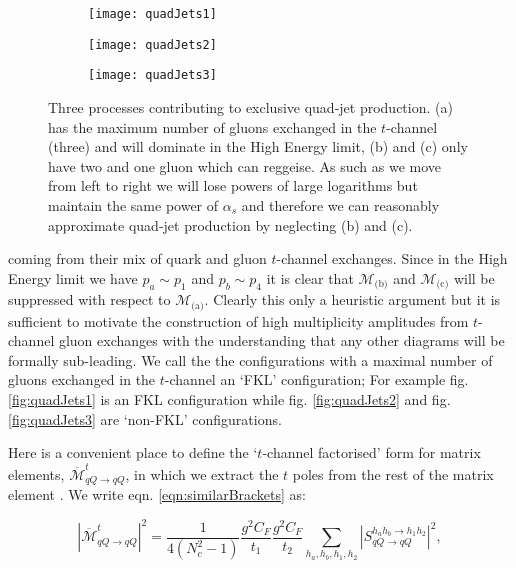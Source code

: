		\begin{figure}[hbt]
			\centering
			\begin{subfigure}[b]{0.31\textwidth}
				\texttt{[image: quadJets1]}
				\caption{}
				\label{fig:quadJets1}
			\end{subfigure}
			\begin{subfigure}[b]{0.31\textwidth}
				\texttt{[image: quadJets2]}
				\caption{}
				\label{fig:quadJets2}
			\end{subfigure}
			\begin{subfigure}[b]{0.31\textwidth}
				\texttt{[image: quadJets3]}
				\caption{}
				\label{fig:quadJets3}
			\end{subfigure}
			\caption{Three processes contributing to exclusive quad-jet production. (a) has the
			maximum number of gluons exchanged in the $t$-channel (three) and will dominate in the High
			Energy limit, (b) and (c) only have two and one gluon which can reggeise.  As such as we move
			from left to right we will lose powers of large logarithms but maintain the same power of
			$\alpha_s$ and therefore we can reasonably approximate quad-jet production by neglecting
			(b) and (c).}
			\label{fig:quadJets}
		\end{figure}

		coming from their mix of quark and gluon $t$-channel exchanges.  Since in the High
		Energy limit we have $p_a\sim p_1$ and $p_b\sim p_4$ it is clear that $\mathcal{M}_{\text{(b)}}$
		and $\mathcal{M}_{\text{(c)}}$ will be suppressed with respect to $\mathcal{M}_{\text{(a)}}$.
		Clearly this only a heuristic argument but it is sufficient to motivate the construction of
		high multiplicity amplitudes from $t$-channel gluon exchanges with the understanding that any
		other diagrams will be formally sub-leading.  We call the the configurations with a maximal
		number of gluons exchanged in the $t$-channel an `FKL' configuration;  For example
		fig. \eqref{fig:quadJets1} is an FKL configuration while fig. \eqref{fig:quadJets2} and fig.
		\eqref{fig:quadJets3} are `non-FKL' configurations.

		Here is a convenient place to define the `$t$-channel factorised' form for matrix elements,
		$\overline{\mathcal{M}}^t_{qQ\rightarrow qQ}$, in which we extract the $t$ poles from the
		rest of the matrix element \cite{Andersen:2009nu}.  We write eqn. \eqref{eqn:similarBrackets}
		as:

		\begin{equation}
			|\overline{\mathcal{M}}^t_{qQ\rightarrow qQ}|^2 = \frac{1}{4(N_c^2-1)}
			\frac{g^2C_F}{t_1}\frac{g^2C_F}{t_2} \sum_{h_a, h_b, h_1, h_2}
			|S_{qQ\rightarrow qQ}^{h_ah_b\rightarrow h_1h_2}|^2,
			\label{eqn:factorised}
		\end{equation}


